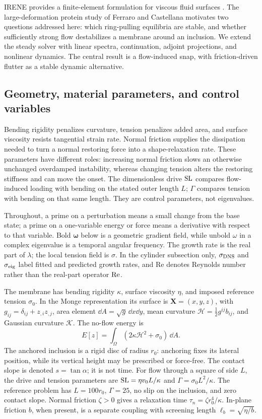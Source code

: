 IRENE provides a finite-element formulation for viscous fluid surfaces \cite{irene}. The large-deformation protein study of Ferraro and Castellana \cite{ferraro} motivates two questions addressed here: which ring-pulling equilibria are stable, and whether sufficiently strong flow destabilizes a membrane around an inclusion. We extend the steady solver with linear spectra, continuation, adjoint projections, and nonlinear dynamics. The central result is a flow-induced snap, with friction-driven flutter as a stable dynamic alternative.


\subsection{Geometry, material parameters, and control variables}


Bending rigidity penalizes curvature, tension penalizes added area, and surface viscosity resists tangential strain rate. Normal friction supplies the dissipation needed to turn a normal restoring force into a shape-relaxation rate. These parameters have different roles: increasing normal friction slows an otherwise unchanged overdamped instability, whereas changing tension alters the restoring stiffness and can move the onset. The dimensionless drive $\mathrm{SL}$ compares flow-induced loading with bending on the stated outer length $L$; $\Gamma$ compares tension with bending on that same length. They are control parameters, not eigenvalues.

Throughout, a prime on a perturbation means a small change from the base state; a prime on a one-variable energy or force means a derivative with respect to that variable. Bold $\bm\omega$ below is a geometric gradient field, while unbold $\omega$ in a complex eigenvalue is a temporal angular frequency. The growth rate is the real part of $\lambda$; the local tension field is $\sigma$. In the cylinder subsection only, $\sigma_{\rm DNS}$ and $\sigma_{\rm eig}$ label fitted and predicted growth rates, and $\mathrm{Re}$ denotes Reynolds number rather than the real-part operator $\operatorname{Re}$.


The membrane has bending rigidity $\kappa$, surface viscosity $\eta$, and imposed reference tension $\sigma_0$. In the Monge representation its surface is $\bm X=(x,y,z)$, with $g_{ij}=\delta_{ij}+z_{,i}z_{,j}$, area element $\dd A=\sqrt g\,\dd x\dd y$, mean curvature $\mathcal H=\tfrac12g^{ij}b_{ij}$, and Gaussian curvature $\mathcal K$. The no-flow energy is
\begin{equation}
E[z]=\int_\Omega(2\kappa\mathcal H^2+\sigma_0)\,\dd A .\label{eq:energy}
\end{equation}
The anchored inclusion is a rigid disc of radius $r_0$: anchoring fixes its lateral position, while its vertical height may be prescribed or force-free. The contact slope is denoted $s=\tan\alpha$; it is not time. For flow through a square of side $L$, the drive and tension parameters are $\mathrm{SL}=\eta v_0L/\kappa$ and $\Gamma=\sigma_0L^2/\kappa$. The reference problem has $L=100r_0$, $\Gamma=25$, no slip on the inclusion, and zero contact slope. Normal friction $\zeta>0$ gives a relaxation time $\tau_n=\zeta r_0^4/\kappa$. In-plane friction $b$, when present, is a separate coupling with screening length $\ell_b=\sqrt{\eta/b}$.


